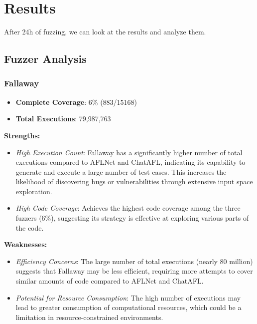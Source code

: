 \chapter{Results}
\label{chap:Results}
After 24h of fuzzing, we can look at the results and analyze them.
\section{Fuzzer Analysis}

\subsection{Fallaway}

\begin{itemize}
    \item \textbf{Complete Coverage}: 6\% (883/15168)
    \item \textbf{Total Executions}: 79,987,763
\end{itemize}

\textbf{Strengths:}
\begin{itemize}
    \item \textit{High Execution Count}: Fallaway has a significantly higher number of total executions compared to AFLNet and ChatAFL, indicating its capability to generate and execute a large number of test cases. This increases the likelihood of discovering bugs or vulnerabilities through extensive input space exploration.
    \item \textit{High Code Coverage}: Achieves the highest code coverage among the three fuzzers (6\%), suggesting its strategy is effective at exploring various parts of the code.
\end{itemize}

\textbf{Weaknesses:}
\begin{itemize}
    \item \textit{Efficiency Concerns}: The large number of total executions (nearly 80 million) suggests that Fallaway may be less efficient, requiring more attempts to cover similar amounts of code compared to AFLNet and ChatAFL.
    \item \textit{Potential for Resource Consumption}: The high number of executions may lead to greater consumption of computational resources, which could be a limitation in resource-constrained environments.
\end{itemize}

